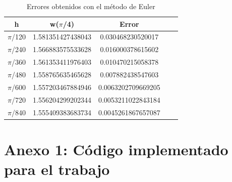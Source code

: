 \documentclass[12pt]{article}       %
\begin{document}
    \begin{table}[H]
        \centering
        \setlength\extrarowheight{3pt}
        
        \begin{tabular}{|c|c|c|c|c}
            \hline
            \textbf{h} & {\textbf{w($\pi$/4)}} & \textbf{Error} \\ 
            \hline
                $\pi$/120 & 1.581351427438043 & 0.030468230520017\\
            \hline
                $\pi$/240 & 1.566883575533628 & 0.016000378615602\\
            \hline
                $\pi$/360 & 1.561353411976403 & 0.010470215058378\\
            \hline
                $\pi$/480 & 1.558765635465628 & 0.007882438547603\\
            \hline
                $\pi$/600 & 1.557203467884946 & 0.0063202709669205\\
            \hline
                $\pi$/720 &  1.556204299202344 & 0.0053211022843184\\
            \hline
                $\pi$/840 & 1.555409383683734 & 0.0045261867657087\\
            \hline
        \end{tabular}
        
        \caption{Errores obtenidos con el método de Euler}           
    \end{table}

\section*{Anexo 1: Código implementado para el trabajo}
\end{document}
